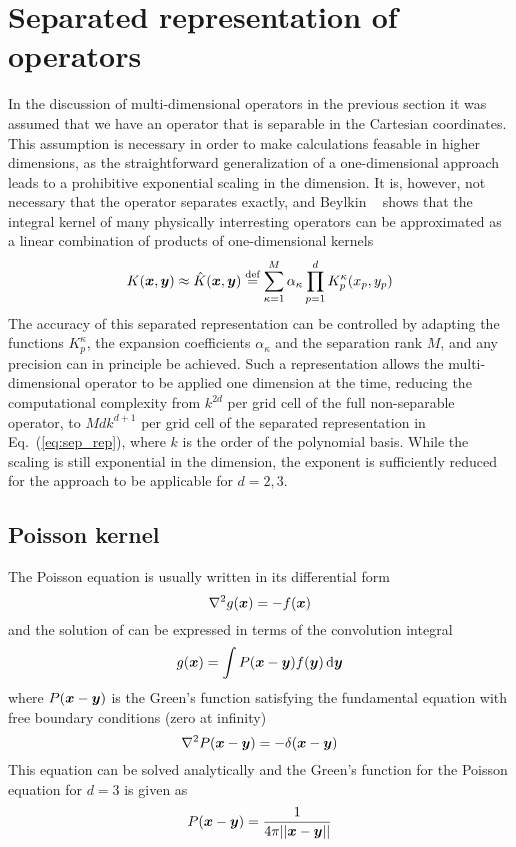 \section{Separated representation of operators}
In the discussion of multi-dimensional operators in the previous section it
was assumed that we have an operator that is separable in the Cartesian
coordinates. This assumption is necessary in order to make calculations
feasable in higher dimensions, as the straightforward generalization of a
one-dimensional approach leads to a prohibitive exponential scaling in the 
dimension. It is,
however, not necessary that the operator separates exactly, and Beylkin 
\etal~\cite{Beylkin} shows that the integral kernel of many physically 
interresting operators can be approximated as a linear combination of 
products of one-dimensional kernels
\begin{equation}
    \label{eq:sep_rep}
    K(\boldsymbol x,\boldsymbol y) \approx \hat{K}(\boldsymbol x,\boldsymbol y) \stackrel{\text{def}}{\hbox{=}} 
	\sum_{\kappa=1}^{M}\alpha_\kappa \prod_{p=1}^d K_p^\kappa(x_p,y_p)
\end{equation}
The accuracy of this separated representation can be controlled by adapting
the functions $K_p^\kappa$, the expansion coefficients $\alpha_\kappa$ and the 
separation rank $M$, and any precision can in principle be achieved. Such
a representation allows the multi-dimensional operator to be applied one 
dimension at the time, reducing the computational complexity from
$k^{2d}$ per grid cell of the full non-separable operator, to $Mdk^{d+1}$ 
per grid cell of the separated representation in Eq.~(\ref{eq:sep_rep}),
where $k$ is the order of the polynomial basis. While the scaling is still 
exponential in the dimension, the exponent is sufficiently reduced for the 
approach to be applicable for $d=2,3$. 

\subsection{Poisson kernel}
The Poisson equation is usually written in its differential form
\begin{equation}
    \nabla^2 g(\boldsymbol x) = -f(\boldsymbol x)
\end{equation}
and the solution of can be expressed in terms of the convolution integral
\begin{equation}
    g(\boldsymbol x) = \int P(\boldsymbol x-\boldsymbol y)f(\boldsymbol y)\,\mathrm{d}\boldsymbol y
\end{equation}
where $P(\boldsymbol x-\boldsymbol y)$ is the Green's function satisfying the fundamental 
equation with free boundary conditions (zero at infinity)
\begin{equation}
    \label{eq:fundamental_poisson}
    \nabla^2 P(\boldsymbol x-\boldsymbol y) = -\delta(\boldsymbol x-\boldsymbol y)
\end{equation}
This equation can be solved analytically and the Green's function for
the Poisson equation for $d=3$ is given as
\begin{equation}
    \label{eq:poisson_kern}
    P(\boldsymbol x-\boldsymbol y) = \frac{1}{4\pi||\boldsymbol x-\boldsymbol y||}
\end{equation}

